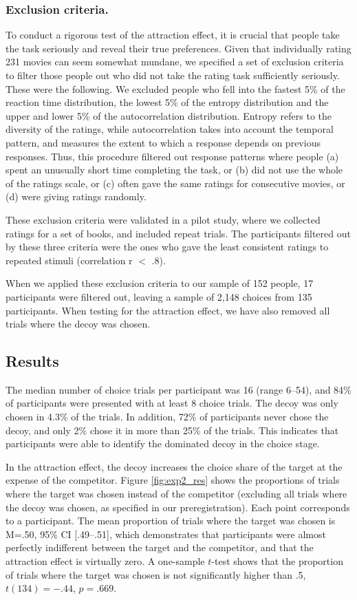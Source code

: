\documentclass[12pt, a4paper]{article}
\begin{document}
\subsubsection*{Exclusion criteria.} \label{exclusion_ref}

To conduct a rigorous test of the attraction effect, it is crucial that people take the task seriously and reveal their true preferences. Given that individually rating 231 movies can seem somewhat mundane, we specified a set of exclusion criteria to filter those people out who did not take the rating task sufficiently seriously. These were the following. We excluded people who fell into the fastest 5\% of the reaction time distribution, the lowest 5\% of the entropy distribution and the upper and lower 5\% of the autocorrelation distribution. Entropy refers to the diversity of the ratings, while autocorrelation takes into account the temporal pattern, and measures the extent to which a response depends on previous responses. Thus, this procedure filtered out response patterns where people (a) spent an unusually short time completing the task, or (b) did not use the whole of the ratings scale, or (c) often gave the same ratings for consecutive movies, or (d) were giving ratings randomly.

These exclusion criteria were validated in a pilot study, where we collected ratings for a set of books, and included repeat trials. The participants filtered out by these three criteria were the ones who gave the least consistent ratings to repeated stimuli (correlation r $<$ .8).

When we applied these exclusion criteria to our sample of 152 people, 17 participants were filtered out, leaving a sample of 2,148 choices from 135 participants. When testing for the attraction effect, we have also removed all trials where the decoy was chosen.


\subsection*{Results}

The median number of choice trials per participant was 16 (range 6--54), and 84\% of participants were presented with at least 8 choice trials. The decoy was only chosen in 4.3\% of the trials. In addition, 72\% of participants never chose the decoy, and only 2\% chose it in more than 25\% of the trials. This indicates that participants were able to identify the dominated decoy in the choice stage. 

In the attraction effect, the decoy increases the choice share of the target at the expense of the competitor. Figure \ref{fig:exp2_res} shows the proportions of trials where the target was chosen instead of the competitor (excluding all trials where the decoy was chosen, as specified in our preregistration). Each point corresponds to a participant. The mean proportion of trials where the target was chosen is M=.50, 95\% CI [.49--.51], which demonstrates that participants were almost perfectly indifferent between the target and the competitor, and that the attraction effect is virtually zero. A one-sample $t$-test shows that the proportion of trials where the target was chosen is not significantly higher than .5, $t(134)=-.44$, $p=.669$. 
\end{document}
